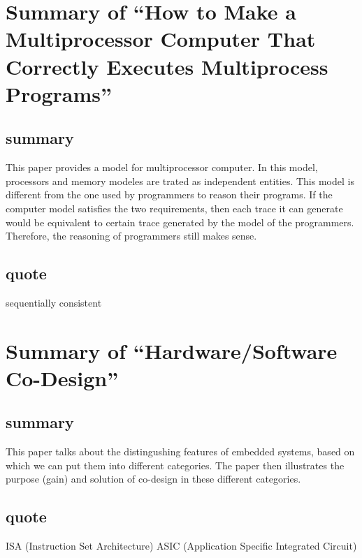 \documentclass{llncs}
\begin{document}

\newpage
\section{Summary of ``How to Make a Multiprocessor Computer That Correctly Executes Multiprocess Programs''\cite{Lamport1979How}} 
  \label{section:multi_processer_program}
\subsection{summary}
This paper provides a model for multiprocessor computer. In this model,
processors and memory modeles are trated as independent entities. This model is
different from the one used by programmers to reason their programs. If the
computer model satisfies the two requirements, then each trace it can generate
would be equivalent to certain trace generated by the model of the programmers.
Therefore, the reasoning of programmers still makes sense.

\subsection{quote}
sequentially consistent


\newpage
\section{Summary of ``Hardware/Software Co-Design''\cite{DeMicheli1997HardwareSoftware}} 
  \label{section:hw_sw_codesign}
\subsection{summary}
This paper talks about the distingushing features of embedded systems, based on
which we can put them into different categories. The paper then illustrates the
purpose (gain) and solution of co-design in these different categories.

\subsection{quote}
ISA (Instruction Set Architecture)
ASIC (Application Specific Integrated Circuit)

\end{document}
